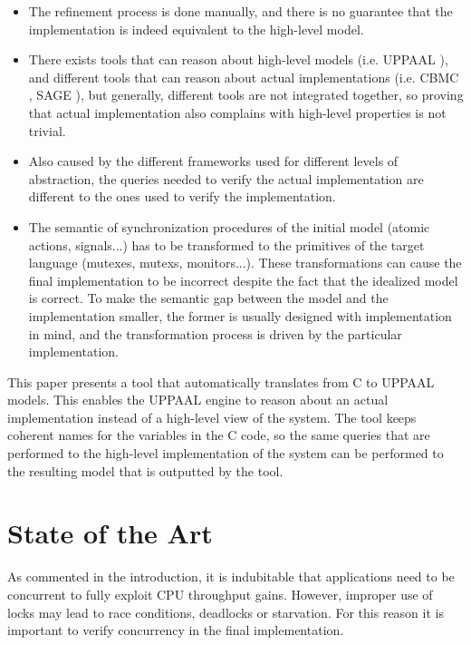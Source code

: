 \documentclass[conference]{IEEEtran}
\begin{document}
\begin{itemize}
    \item The refinement process is done manually, and there is no guarantee that the implementation is indeed equivalent to the high-level model.
    \item There exists tools that can reason about high-level models (i.e. UPPAAL \cite{uppaal}), and different tools that can reason about actual implementations (i.e. CBMC \cite{cbmc}, SAGE \cite{sage}), but generally, different tools are not integrated together, so proving that actual implementation also complains with high-level properties is not trivial.
    \item Also caused by the different frameworks used for different levels of abstraction, the queries needed to verify the actual implementation are different to the ones used to verify the implementation.
    
    \item The semantic of synchronization procedures of the initial model (atomic actions, signals...) has to be transformed to the primitives of the target language (mutexes, mutexs, monitors...). These transformations can cause the final implementation to be incorrect despite the fact that the idealized model is correct. To make the semantic gap between the model and the implementation smaller, the former is usually designed with implementation in mind, and the transformation process is driven by the particular implementation.
    
\end{itemize}

This paper presents a tool that automatically translates from C to UPPAAL models. This enables the UPPAAL engine to reason about an actual implementation instead of a high-level view of the system. The tool keeps coherent names for the variables in the C code, so the same queries that are performed to the high-level implementation of the system can be performed to the resulting model that is outputted by the tool.

\section{State of the Art}

As commented in the introduction, it is indubitable that applications need to be concurrent to fully exploit CPU throughput gains. However, improper use of locks may lead to race conditions, deadlocks or starvation. For this reason it is important to verify concurrency in the final implementation. 
\end{document}
